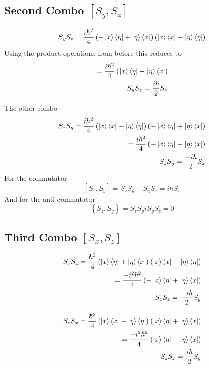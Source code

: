 \documentclass[]{article}
\begin{document}
\hypertarget{second-combo-left-s_ys_z-right}{%
\subsection{\texorpdfstring{Second Combo
\(\left[ S_{y},S_{z} \right]\)}{Second Combo \textbackslash left{[} S\_\{y\},S\_\{z\} \textbackslash right{]}}}\label{second-combo-left-s_ys_z-right}}

\[
S_{y}S_{z} = \frac{i\hbar^{2}}{4}\left( -\ket{x} \bra{\eta} +\ket{\eta} \bra{x}  \right) \left( \ket{x} \bra{x} -\ket{\eta} \bra{\eta}  \right) 
\] Using the product operations from before this reduces to \[
\begin{align}
=\frac{i\hbar^{2}}{4} \left( \ket{x} \bra{\eta} +\ket{\eta} \bra{x}  \right)   \\
S_{y}S_{z}  =\frac{i\hbar}{2}S_{x}
\end{align}
\]

The other combo \[
\begin{align}
S_{z}S_{y} = \frac{i\hbar^2}{4}\left( \ket{x} \bra{x} -\ket{\eta} \bra{\eta}   \right)\left( -\ket{x} \bra{\eta} +\ket{\eta} \bra{x}  \right) \\
=\frac{i\hbar^{2}}{4}\left( -\ket{x} \bra{\eta} -\ket{\eta}\bra{x}   \right)  \\
S_{z}S_{y} = \frac{-i\hbar}{2}S_{x}
\end{align}
\] For the commutator \[
\left[ S_{z},S_{y} \right]  = S_{z}S_{y}-S_{y}S_{z} = i\hbar S_{z}
\] And for the anti-commutator \[
\left\{ S_{z},S_{y} \right\}  = S_{z}S_{y}iS_{y}S_{z} = 0
\]

\hypertarget{third-combo-left-s_xs_z-right}{%
\subsection{\texorpdfstring{Third Combo
\(\left[ S_{x},S_{z} \right]\)}{Third Combo \textbackslash left{[} S\_\{x\},S\_\{z\} \textbackslash right{]}}}\label{third-combo-left-s_xs_z-right}}

\[
\begin{align}
S_{x}S_{z} = \frac{\hbar^{2}}{4}\left( \ket{x}   \bra{\eta} +\ket{\eta} \bra{x} \right) \left( \ket{x} \bra{x} -\ket{\eta} \bra{\eta}  \right)  \\
=\frac{-i^2\hbar^{2}}{4}\left( -\ket{x} \bra{\eta} +\ket{\eta} \bra{x}  \right)  \\
S_{x}S_{z}= \frac{-i\hbar}{2}S_{y}
\end{align}
\]

\[
\begin{align}
S_{z}S_{x} = \frac{\hbar^{2}}{4}\left( \ket{x} \bra{x} -\ket{\eta} \bra{\eta}  \right)  \left( \ket{x}   \bra{\eta} +\ket{\eta} \bra{x} \right) \\
=\frac{-i^2\hbar^{2}}{4}\left( \ket{x} \bra{\eta} -\ket{\eta} \bra{x}  \right)  \\
S_{z}S_{x}= \frac{i\hbar}{2}S_{y}
\end{align}
\]
\end{document}
